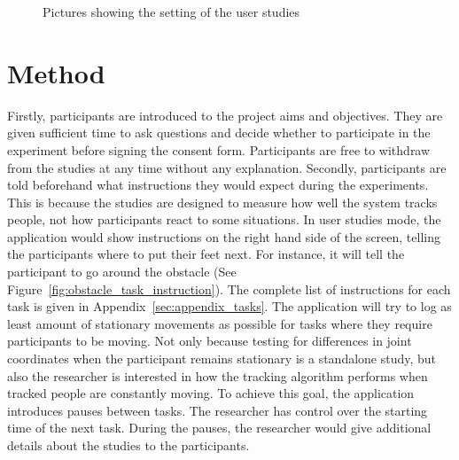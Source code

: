 \begin{figure}[!h]
  \centering

  
  \caption{Pictures showing the setting of the user studies}
  
  \label{fig:studies_setting}
\end{figure}

\section{Method}
\label{sec:studies_method}

Firstly, participants are introduced to the project aims and objectives. They are given sufficient time to ask questions and decide whether to participate in the experiment before signing the consent form. Participants are free to withdraw from the studies at any time without any explanation. Secondly, participants are told beforehand what instructions they would expect during the experiments. This is because the studies are designed to measure how well the system tracks people, not how participants react to some situations. In user studies mode, the application would show instructions on the right hand side of the screen, telling the participants where to put their feet next. For instance, it will tell the participant to go around the obstacle (See Figure~\ref{fig:obstacle_task_instruction}). The complete list of instructions for each task is given in Appendix~\ref{sec:appendix_tasks}. The application will try to log as least amount of stationary movements as possible for tasks where they require participants to be moving. Not only because testing for differences in joint coordinates when the participant remains stationary is a standalone study, but also the researcher is interested in how the tracking algorithm performs when tracked people are constantly moving. To achieve this goal, the application introduces pauses between tasks. The researcher has control over the starting time of the next task. During the pauses, the researcher would give additional details about the studies to the participants.

